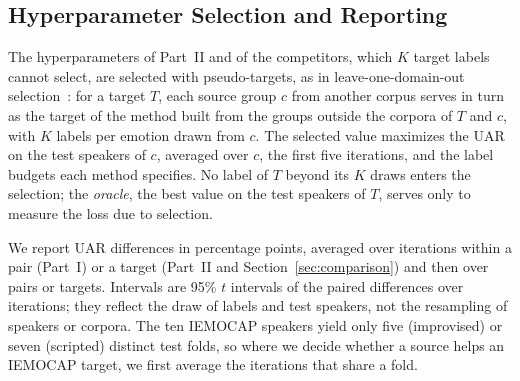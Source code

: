 \subsection{Hyperparameter Selection and Reporting}
\label{sec:setting-selection}

The hyperparameters of Part~II and of the competitors, which $K$ target labels cannot select, are selected with pseudo-targets, as in leave-one-domain-out selection~\cite{gulrajani2021domainbed}: for a target $T$, each source group $c$ from another corpus serves in turn as the target of the method built from the groups outside the corpora of $T$ and $c$, with $K$ labels per emotion drawn from $c$.
The selected value maximizes the UAR on the test speakers of $c$, averaged over $c$, the first five iterations, and the label budgets each method specifies.
No label of $T$ beyond its $K$ draws enters the selection; the \emph{oracle}, the best value on the test speakers of $T$, serves only to measure the loss due to selection.

We report UAR differences in percentage points, averaged over iterations within a pair (Part~I) or a target (Part~II and Section~\ref{sec:comparison}) and then over pairs or targets.
Intervals are 95\% $t$ intervals of the paired differences over iterations; they reflect the draw of labels and test speakers, not the resampling of speakers or corpora.
The ten IEMOCAP speakers yield only five (improvised) or seven (scripted) distinct test folds, so where we decide whether a source helps an IEMOCAP target, we first average the iterations that share a fold.
